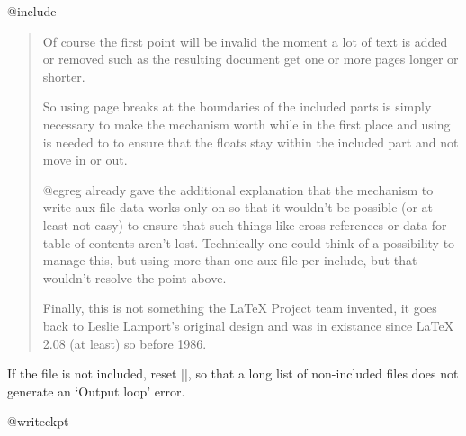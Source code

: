 \begin{multicols}
\begin{docCommand}{@include}{}
\begin{quotation}
Of course the first point will be invalid the moment a lot of text is added or removed such as the resulting document get one or more pages longer or shorter.

So using page breaks at the boundaries of the included parts is simply necessary to make the mechanism worth while in the first place and using  is needed to to ensure that the floats stay within the included part and not move in or out.

@egreg already gave the additional explanation that the mechanism to write aux file data works only on  so that it wouldn't be possible (or at least not easy) to ensure that such things like cross-references or data for table of contents aren't lost. Technically one could think of a possibility to manage this, but using more than one aux file per include, but that wouldn't resolve the point above.

Finally, this is not something the LaTeX Project team invented, it goes back to Leslie Lamport's original design and was in existance since LaTeX 2.08 (at least) so before 1986.
\end{quotation} 
 \end{docCommand}
    \begin{teX}
\def\@include#1 {%
  \clearpage
  \if@filesw
    \immediate\write\@mainaux{\string\@input{#1.aux}}%
  \fi
  \@tempswatrue
  \if@partsw
    \@tempswafalse
    \edef\reserved@b{#1}%
    \@for\reserved@a:=\@partlist\do
      {\ifx\reserved@a\reserved@b\@tempswatrue\fi}%
  \fi
  \if@tempswa
    \let\@auxout\@partaux
    \if@filesw
      \immediate\openout\@partaux #1.aux
      \immediate\write\@partaux{\relax}%
    \fi
    \@input@{#1.tex}%
    \clearpage
    \@writeckpt{#1}%
    \if@filesw
      \immediate\closeout\@partaux
    \fi
  \else
     \end{teX}
 If the file is not included, reset |\deadcycles|, so that a long
 list of non-included files does not generate an `Output loop'
 error.

    \begin{teX}
    \deadcycles\z@
  \fi
  \let\@auxout\@mainaux}
    \end{teX}



 \begin{docCommand}{@writeckpt}{}
 \end{docCommand}
    \begin{teX}
\def\@writeckpt#1{%
  \if@filesw
    \immediate\write\@partaux{\string\@setckpt{#1}\@charlb}%
    {\let\@elt\@wckptelt \cl@@ckpt}%
    \immediate\write\@partaux{\@charrb}%
  \fi}
    \end{teX}



\end{multicols}
